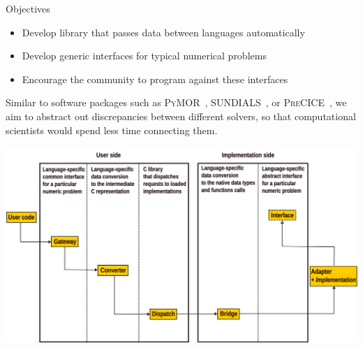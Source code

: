 \documentclass[a0paper, twocolumn, csc, english, final]{mpi2015_poster}
\begin{document}
\begin{poster}
\begin{pcolumn}
\begin{pbox}

      \begin{center}
        \begin{tcolorbox}[
            colback=white, colframe=mardiblue, parbox=true,
            left=1em, right=1em,
            before={\par\bigskip\noindent}, after={\par\bigskip},  width=\columnwidth]
          {\Large\color{mardiblue}Objectives\medskip}
          \begin{itemize}
            \item Develop library that passes data between languages automatically
            \item Develop generic interfaces for typical numerical problems
            \item Encourage the community to program against these interfaces
          \end{itemize}
        \end{tcolorbox}
      \end{center}

      Similar to software packages such as \textsc{PyMOR}~\citep{Milk2016},
      \textsc{SUNDIALS}~\citep{GardnerEtAl2022},
      or \textsc{PreCICE}~\citep{Chourdakis2022},
      we aim to abstract out discrepancies between
      different solvers, so that computational scientists would spend less time
      connecting them.

    \end{pbox}

    \begin{pbox}
      \large
      \includegraphics[width=\columnwidth]{arch}


\end{pbox}
\end{pcolumn}
\end{poster}
\end{document}
